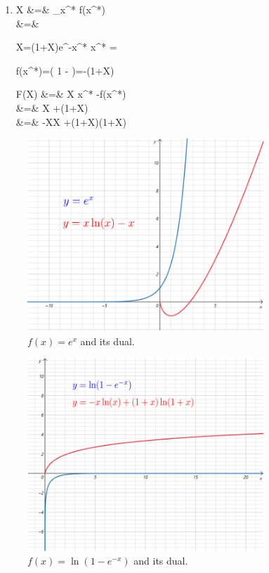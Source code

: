 \begin{enumerate}
\hrule
\item
\beq
{}
\eeq

\beqa
X
&=&
\partial_{x^*} f(x^*)
\\
&=&
\eeqa

\beq
X=(1+X)e^{-x^*}
\eeq
\beq
x^* = \ln{}
\eeq

\beq
f(x^*)=\ln\left(
1 - 
\right)=-\ln(1+X)
\eeq

\beqa
F(X) &=& X x^* -f(x^*)
\\
&=&
X \ln{}
+\ln(1+X)
\\
&=&
-X\ln  X
+(1+X)\ln(1+X)
\eeqa
\end{enumerate}


\begin{figure}[h!]
\centering
\includegraphics[width=3.5in]
{var-bay-medical/dual-ex.png}
\caption{$f(x)=e^x$ and its dual.}
\label{fig-dual-ex}
\end{figure}

\begin{figure}[h!]
\centering
\includegraphics[width=3.5in]
{var-bay-medical/dual-ln-1-e-x.png}
\caption{$f(x)=\ln(1-e^{-x})$ and its dual.}
\label{fig-dual-dual-ln-1-e-x}
\end{figure}



